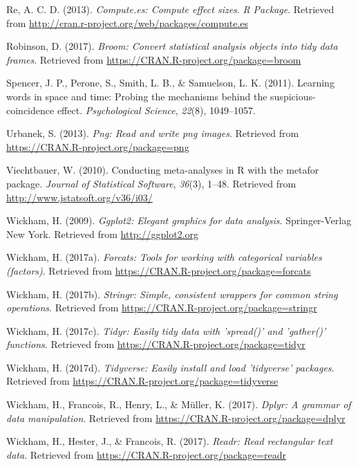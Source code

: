 \documentclass[english,floatsintext,man]{apa6}
\theoremstyle{definition}
\theoremstyle{definition}
\theoremstyle{remark}
\begin{document}
\hypertarget{ref-R-compute.es}{}
Re, A. C. D. (2013). \emph{Compute.es: Compute effect sizes}. \emph{R
Package}. Retrieved from
\url{http://cran.r-project.org/web/packages/compute.es}

\hypertarget{ref-R-broom}{}
Robinson, D. (2017). \emph{Broom: Convert statistical analysis objects
into tidy data frames}. Retrieved from
\url{https://CRAN.R-project.org/package=broom}

\hypertarget{ref-spencer2011learning}{}
Spencer, J. P., Perone, S., Smith, L. B., \& Samuelson, L. K. (2011).
Learning words in space and time: Probing the mechanisms behind the
suspicious-coincidence effect. \emph{Psychological Science},
\emph{22}(8), 1049--1057.

\hypertarget{ref-R-png}{}
Urbanek, S. (2013). \emph{Png: Read and write png images}. Retrieved
from \url{https://CRAN.R-project.org/package=png}

\hypertarget{ref-R-metafor}{}
Viechtbauer, W. (2010). Conducting meta-analyses in R with the metafor
package. \emph{Journal of Statistical Software}, \emph{36}(3), 1--48.
Retrieved from \url{http://www.jstatsoft.org/v36/i03/}

\hypertarget{ref-R-ggplot2}{}
Wickham, H. (2009). \emph{Ggplot2: Elegant graphics for data analysis}.
Springer-Verlag New York. Retrieved from \url{http://ggplot2.org}

\hypertarget{ref-R-forcats}{}
Wickham, H. (2017a). \emph{Forcats: Tools for working with categorical
variables (factors)}. Retrieved from
\url{https://CRAN.R-project.org/package=forcats}

\hypertarget{ref-R-stringr}{}
Wickham, H. (2017b). \emph{Stringr: Simple, consistent wrappers for
common string operations}. Retrieved from
\url{https://CRAN.R-project.org/package=stringr}

\hypertarget{ref-R-tidyr}{}
Wickham, H. (2017c). \emph{Tidyr: Easily tidy data with 'spread()' and
'gather()' functions}. Retrieved from
\url{https://CRAN.R-project.org/package=tidyr}

\hypertarget{ref-R-tidyverse}{}
Wickham, H. (2017d). \emph{Tidyverse: Easily install and load
'tidyverse' packages}. Retrieved from
\url{https://CRAN.R-project.org/package=tidyverse}

\hypertarget{ref-R-dplyr}{}
Wickham, H., Francois, R., Henry, L., \& Müller, K. (2017). \emph{Dplyr:
A grammar of data manipulation}. Retrieved from
\url{https://CRAN.R-project.org/package=dplyr}

\hypertarget{ref-R-readr}{}
Wickham, H., Hester, J., \& Francois, R. (2017). \emph{Readr: Read
rectangular text data}. Retrieved from
\url{https://CRAN.R-project.org/package=readr}
\end{document}
